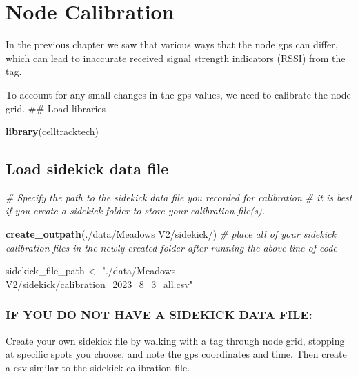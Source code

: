 \documentclass[
]{book}
\newenvironment{Shaded}{\begin{snugshade}}{\end{snugshade}}
\newcommand{\CommentTok}[1]{\textcolor[rgb]{0.56,0.35,0.01}{\textit{#1}}}
\newcommand{\FunctionTok}[1]{\textcolor[rgb]{0.13,0.29,0.53}{\textbf{#1}}}
\newcommand{\NormalTok}[1]{#1}
\newcommand{\OtherTok}[1]{\textcolor[rgb]{0.56,0.35,0.01}{#1}}
\newcommand{\StringTok}[1]{\textcolor[rgb]{0.31,0.60,0.02}{#1}}
\begin{document}
\chapter{Node Calibration}\label{node-calibration}

In the previous chapter we saw that various ways that the node gps can differ, which can lead to inaccurate received signal strength indicators (RSSI) from the tag.

To account for any small changes in the gps values, we need to calibrate the node grid.
\#\# Load libraries

\begin{Shaded}
\begin{Highlighting}[]
\FunctionTok{library}\NormalTok{(celltracktech)}
\end{Highlighting}
\end{Shaded}

\section{Load sidekick data file}\label{load-sidekick-data-file}

\begin{Shaded}
\begin{Highlighting}[]
\CommentTok{\# Specify the path to the sidekick data file you recorded for calibration}
\CommentTok{\# it is best if you create a \textquotesingle{}sidekick\textquotesingle{} folder to store your calibration file(s).}

\FunctionTok{create\_outpath}\NormalTok{(}\StringTok{\textquotesingle{}./data/Meadows V2/sidekick/\textquotesingle{}}\NormalTok{)}
\CommentTok{\# place all of your sidekick calibration files in the newly created folder after running the above line of code}

\NormalTok{sidekick\_file\_path }\OtherTok{\textless{}{-}} \StringTok{"./data/Meadows V2/sidekick/calibration\_2023\_8\_3\_all.csv"}
\end{Highlighting}
\end{Shaded}

\subsection{IF YOU DO NOT HAVE A SIDEKICK DATA FILE:}\label{if-you-do-not-have-a-sidekick-data-file}

Create your own sidekick file by walking with a tag through node grid, stopping at specific spots you choose, and note the gps coordinates and time. Then create a csv similar to the sidekick calibration file.
\end{document}

